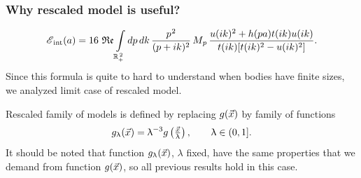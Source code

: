 \documentclass[10pt,t]{beamer}
\begin{document}
\begin{frame}
  \frametitle{Why rescaled model is useful?}

  \vspace{-2em}


  \begin{equation}
    \label{eq:Rescaled-version-of-the-model-01}
    \mathcal{E}_{ \, \textrm{int}}( a ) =
    16 \, \operatorname{\mathfrak{Re}} \int\limits_{ \mathbb{R}_{ + }^{ \, 2 } } dp \, dk \,
    \frac{ p^{ \hspace{0.05em} 2 } }{ ( p + i k )^{ 2 } } \, M_{ \hspace{0.05em} p } \,
    \frac{ u( i k )^{ 2 } + h( p a ) t( i k ) u( i k ) }{
      t( i k ) [ t( i k )^{ 2 } - u( i k )^{ 2 } ] }.
  \end{equation}
  Since this formula is quite to hard to understand when bodies have finite
  sizes, we analyzed limit case of rescaled model.

  Rescaled family of models is defined by replacing $g( \vec{x} )$ by family
  of functions
  \begin{equation}
    \label{eq:Rescaled-version-of-the-model-02}
    g_{ \uplambda }( \vec{x} ) =
    \uplambda^{ -3 } g\left( \tfrac{ \vec{x} }{ \uplambda } \right), \qquad
    \uplambda \in ( 0, 1 ].
  \end{equation}
  It should be noted that function $g_{ \uplambda }( \vec{x} )$, $\lambda$ fixed, have the
  same properties that we demand from function $g( \vec{x} )$, so all
  previous results hold in this case.

\end{frame}
\end{document}
